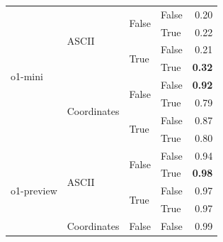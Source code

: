\begin{tabular}{@{}llllr@{}}
    \midrule        
    \multirow[c]{8}{*}{o1-mini}     & \multirow[c]{4}{*}{ASCII}         & \multirow[c]{2}{*}{False} & False                     & 0.20 \\
                                    &                                   &                           & True                      & 0.22 \\
                                    &                                   & \multirow[c]{2}{*}{True}  & False                     & 0.21 \\
                                    &                                   &                           & True                      & \textbf{0.32} \\
    \cmidrule{2-5}                                                                                                                 
                                    & \multirow[c]{4}{*}{Coordinates}   & \multirow[c]{2}{*}{False} & False                     & \textbf{0.92} \\
                                    &                                   &                           & True                      & 0.79 \\
                                    &                                   & \multirow[c]{2}{*}{True}  & False                     & 0.87 \\
                                    &                                   &                           & True                      & 0.80 \\
    \midrule        
    \multirow[c]{8}{*}{o1-preview}  & \multirow[c]{4}{*}{ASCII}         & \multirow[c]{2}{*}{False} & False                     & 0.94 \\
                                    &                                   &                           & True                      & \textbf{0.98} \\
                                    &                                   & \multirow[c]{2}{*}{True}  & False                     & 0.97 \\
                                    &                                   &                           & True                      & 0.97 \\
    \cmidrule{2-5}                                                                                                                 
                                    & \multirow[c]{4}{*}{Coordinates}   & \multirow[c]{2}{*}{False} & False                     & 0.99 \\

\end{tabular}
